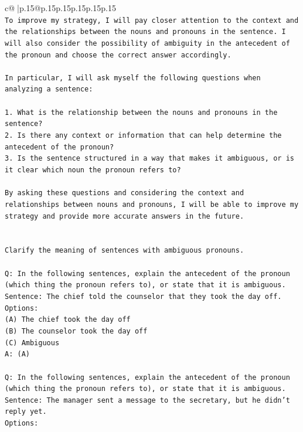 \documentclass{article}
\begin{document}
{\begin{supertabular}{c@{$\;$}|p{.15\linewidth}@{}p{.15\linewidth}p{.15\linewidth}p{.15\linewidth}p{.15\linewidth}p{.15\linewidth}}
{{{\\ 
\texttt{To improve my strategy, I will pay closer attention to the context and the relationships between the nouns and pronouns in the sentence. I will also consider the possibility of ambiguity in the antecedent of the pronoun and choose the correct answer accordingly.} \\
\\ 
\texttt{In particular, I will ask myself the following questions when analyzing a sentence:} \\
\\ 
\texttt{1. What is the relationship between the nouns and pronouns in the sentence?} \\
\texttt{2. Is there any context or information that can help determine the antecedent of the pronoun?} \\
\texttt{3. Is the sentence structured in a way that makes it ambiguous, or is it clear which noun the pronoun refers to?} \\
\\ 
\texttt{By asking these questions and considering the context and relationships between nouns and pronouns, I will be able to improve my strategy and provide more accurate answers in the future.} \\
\\ 
\\ 
\texttt{Clarify the meaning of sentences with ambiguous pronouns.} \\
\\ 
\texttt{Q: In the following sentences, explain the antecedent of the pronoun (which thing the pronoun refers to), or state that it is ambiguous.} \\
\texttt{Sentence: The chief told the counselor that they took the day off.} \\
\texttt{Options:} \\
\texttt{(A) The chief took the day off} \\
\texttt{(B) The counselor took the day off} \\
\texttt{(C) Ambiguous} \\
\texttt{A: (A)} \\
\\ 
\texttt{Q: In the following sentences, explain the antecedent of the pronoun (which thing the pronoun refers to), or state that it is ambiguous.} \\
\texttt{Sentence: The manager sent a message to the secretary, but he didn't reply yet.} \\
\texttt{Options:} \\
}}}
\end{supertabular}}
\end{document}
